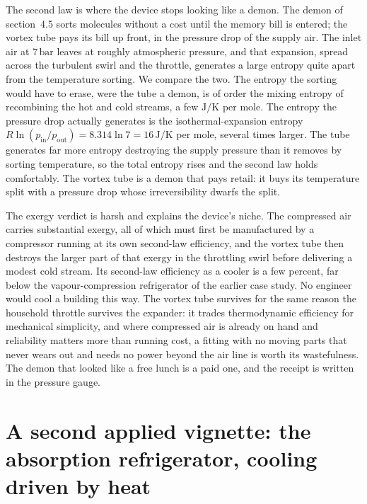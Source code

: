 The second law is where the device stops looking like a demon. The demon of
section~4.5 sorts molecules without a cost until the memory bill is entered; the
vortex tube pays its bill up front, in the pressure drop of the supply air. The
inlet air at $7\,\text{bar}$ leaves at roughly atmospheric pressure, and that
expansion, spread across the turbulent swirl and the throttle, generates a large
entropy quite apart from the temperature sorting. We compare the two. The
entropy the sorting would have to erase, were the tube a demon, is of order the
mixing entropy of recombining the hot and cold streams, a few
$\si{\joule\per\kelvin}$ per mole. The entropy the pressure drop actually
generates is the isothermal-expansion entropy $R\ln(p_{\text{in}}/p_{\text{out}})
= 8.314\ln 7 = 16\,\si{\joule\per\kelvin}$ per mole, several times larger. The
tube generates far more entropy destroying the supply pressure than it removes
by sorting temperature, so the total entropy rises and the second law holds
comfortably. The vortex tube is a demon that pays retail: it buys its
temperature split with a pressure drop whose irreversibility dwarfs the split.

The exergy verdict is harsh and explains the device's niche. The compressed air
carries substantial exergy, all of which must first be manufactured by a
compressor running at its own second-law efficiency, and the vortex tube then
destroys the larger part of that exergy in the throttling swirl before delivering
a modest cold stream. Its second-law efficiency as a cooler is a few percent,
far below the vapour-compression refrigerator of the earlier case study. No
engineer would cool a building this way. The vortex tube survives for the same
reason the household throttle survives the expander: it trades thermodynamic
efficiency for mechanical simplicity, and where compressed air is already on hand
and reliability matters more than running cost, a fitting with no moving parts
that never wears out and needs no power beyond the air line is worth its
wastefulness. The demon that looked like a free lunch is a paid one, and the
receipt is written in the pressure gauge.



\section{A second applied vignette: the absorption refrigerator, cooling driven by heat}

